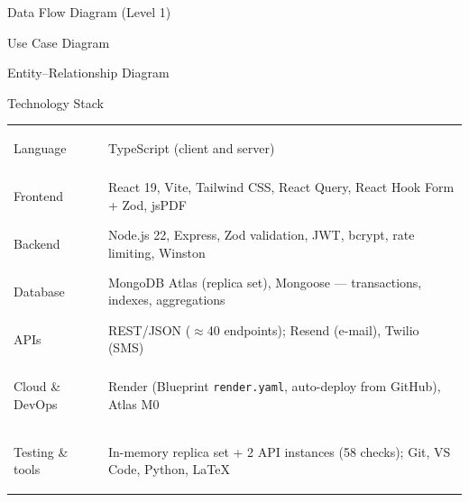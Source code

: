 \documentclass[aspectratio=169,11pt]{beamer}
\newcommand{\diagram}[2][0.78]{\begin{center}\resizebox{!}{#1\textheight}{}\end{center}}
\begin{document}
\begin{frame}{Data Flow Diagram (Level 1)}
\diagram[0.8]{dfd1}
\end{frame}

\begin{frame}{Use Case Diagram}
\diagram[0.84]{usecase}
\end{frame}

\begin{frame}{Entity--Relationship Diagram}
\diagram[0.84]{er}
\end{frame}

\begin{frame}{Technology Stack}
\small
\begin{tabularx}{\textwidth}{>{\bfseries\raggedright\arraybackslash}p{3.1cm}X}
\toprule
Language & TypeScript (client and server)\\
Frontend & React 19, Vite, Tailwind CSS, React Query, React Hook Form + Zod, jsPDF\\
Backend & Node.js 22, Express, Zod validation, JWT, bcrypt, rate limiting, Winston\\
Database & MongoDB Atlas (replica set), Mongoose --- transactions, indexes, aggregations\\
APIs & REST/JSON ($\approx$40 endpoints); Resend (e-mail), Twilio (SMS)\\
Cloud \& DevOps & Render (Blueprint \texttt{render.yaml}, auto-deploy from GitHub), Atlas M0\\
Testing \& tools & In-memory replica set + 2 API instances (58 checks); Git, VS Code, Python, \LaTeX\\
\bottomrule
\end{tabularx}
\end{frame}
\end{document}

